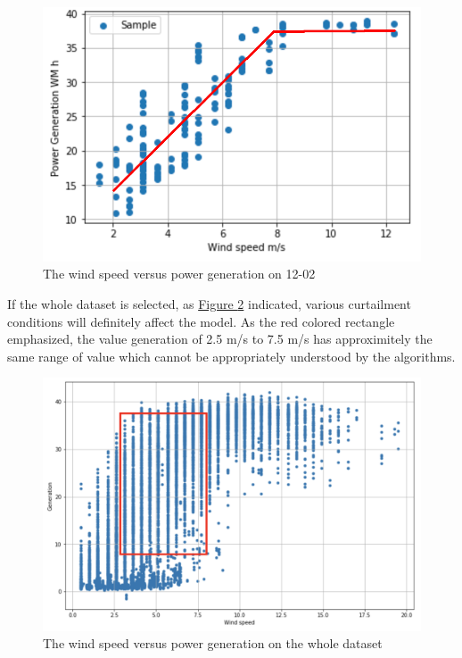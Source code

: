 \documentclass[12pt,a4paper]{report}
\begin{document}
                    \begin{figure}[ht]
                        \centerline{\includegraphics[scale=1.4]{powervsgenerationsample}}
                        \caption{The wind speed versus power generation on 12-02}
                        \label{plot_speed_vs_power_1202}
                    \end{figure}
                
                    If the whole dataset is selected, as \hyperref[plot_speed_vs_power_whole]{Figure \ref*{plot_speed_vs_power_whole}} indicated, various curtailment conditions will definitely affect the model. As the red colored rectangle emphasized, the value generation of 2.5 m/s to 7.5 m/s has approximitely the same range of value which cannot be appropriately understood by the algorithms.

                    \begin{figure}[ht]
                        \centerline{\includegraphics[scale=0.2]{generationvsspeedwholeset}}
                        \caption{The wind speed versus power generation on the whole dataset}
                        \label{plot_speed_vs_power_whole}
                    \end{figure}
\end{document}
